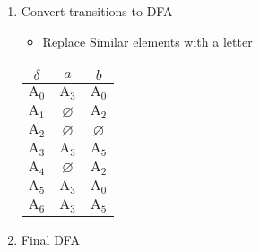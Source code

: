 \documentclass{article}
\def\hltt{\color{BrightGreen}}
\newcommand{\indentpar}[2]{
	\begin{itemize}[leftmargin=#1,label=]
		\item #2
	\end{itemize}
}
\newlength{\ansindent}
\begin{document}
\begin{enumerate}[label=\arabic*)]
\begin{enumerate}[label=Step \arabic* :,itemindent=\ansindent]
\begin{table}[H]
\begin{tabular}{cc}
\begin{tabular}{c|c|c}
								$\{q_0,q_1,q_2\}$ & $\{q_0,q_1\}$ & $\{q_0,q_2\}$
							\end{tabular} &
							\begin{tabular}{clc}
								$\delta(q_0,a)$             & $=$ & $\{q_0,q_1\}$ \\
								$\delta(q_0,b)$             & $=$ & $q_0$         \\
								$\delta(q_1,b)$             & $=$ & $q_2$         \\
								$\delta(\{q_0,q_1\},a)$     & $=$ & $\{q_0,q_1\}$ \\
								$\delta(\{q_0,q_1\},b)$     & $=$ & $\{q_0,q_2\}$ \\
								$\delta(\{q_1,q_2\},b)$     & $=$ & $q_2$         \\
								$\delta(\{q_2,q_0\},a)$     & $=$ & $\{q_0,q_1\}$ \\
								$\delta(\{q_0,q_2\},b)$     & $=$ & $q_0$         \\
								$\delta(\{q_0,q_1,q_2\},a)$ & $=$ & $\{q_0,q_1\}$ \\
								$\delta(\{q_0,q_1,q_2\},b)$ & $=$ & $\{q_0,q_2\}$
							\end{tabular}
						\end{tabular}
					\end{table}
					\item Convert transitions to DFA
						\indentpar{1.5em}{Replace Similar elements with a letter}
						\begin{table}[H]
							\centering
							\begin{tabular}{c|c|c}
								$\delta$     & $a$                & $b$                \\ \hline
						\hltt	$\text{A}_0$ & \hltt $\text{A}_3$ & \hltt $\text{A}_0$ \\
								$\text{A}_1$ & $\varnothing$      & $\text{A}_2$       \\
								$\text{A}_2$ & $\varnothing$      & $\varnothing$      \\
						\hltt	$\text{A}_3$ & \hltt $\text{A}_3$ & \hltt $\text{A}_5$ \\
								$\text{A}_4$ & $\varnothing$      & $\text{A}_2$       \\
						\hltt	$\text{A}_5$ & \hltt $\text{A}_3$ & \hltt $\text{A}_0$ \\
								$\text{A}_6$ & $\text{A}_3$       & $\text{A}_5$
							\end{tabular}
						\end{table}
				\item Final DFA 
			\end{enumerate}
	\end{enumerate} \newpage
\end{document}
